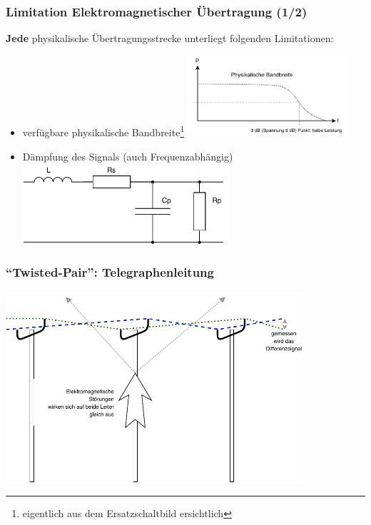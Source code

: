 \documentclass[ignorenonframetext]{beamer}
\begin{document}
\begin{frame}
\frametitle{Limitation Elektromagnetischer \"Ubertragung (1/2)}
{\bfseries Jede} physikalische \"Ubertragungsstrecke unterliegt folgenden Limitationen:

\begin{itemize}
  \item verf\"ugbare physikalische Bandbreite\footnote{eigentlich aus dem Ersatzschaltbild ersichtlich} \includegraphics[height=3cm]{bandwidth}
  \item D\"ampfung des Signals (auch Frequenzabh\"angig) \includegraphics[height=3cm]{line-circuit}
\end{itemize}
\end{frame}



\begin{frame}
\frametitle{``Twisted-Pair'': Telegraphenleitung}
\includegraphics[width=11cm]{telegraph-line}
\end{frame}
\end{document}
